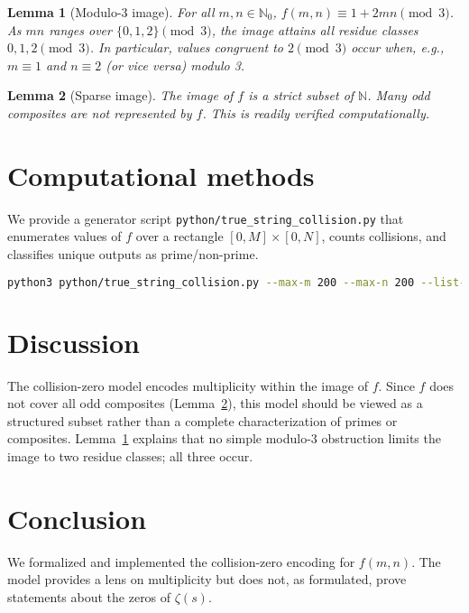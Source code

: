 \documentclass[12pt,a4paper]{article}
\newtheorem{lemma}{Lemma}[section]
\begin{document}
\begin{lemma}[Modulo-3 image]\label{lem:mod3}
For all \(m,n\in\mathbb{N}_0\), \(f(m,n) \equiv 1 + 2mn \pmod{3}\). As \(mn\) ranges over \(\{0,1,2\}\pmod{3}\), the image attains all residue classes \(0,1,2\pmod{3}\). In particular, values congruent to \(2\pmod{3}\) occur when, e.g., \(m\equiv 1\) and \(n\equiv 2\) (or vice versa) modulo 3.
\end{lemma}

\begin{lemma}[Sparse image]\label{lem:sparse}
The image of \(f\) is a strict subset of \(\mathbb{N}\). Many odd composites are not represented by \(f\). This is readily verified computationally.
\end{lemma}

\section{Computational methods}
We provide a generator script \texttt{python/true\_string\_collision.py} that enumerates values of \(f\) over a rectangle \([0,M]\times[0,N]\), counts collisions, and classifies unique outputs as prime/non-prime.

\begin{lstlisting}[language=bash,caption=Example usage]
python3 python/true_string_collision.py --max-m 200 --max-n 200 --list-first 20
\end{lstlisting}

\section{Discussion}
The collision-zero model encodes multiplicity within the image of \(f\). Since \(f\) does not cover all odd composites (Lemma~\ref{lem:sparse}), this model should be viewed as a structured subset rather than a complete characterization of primes or composites. Lemma~\ref{lem:mod3} explains that no simple modulo-3 obstruction limits the image to two residue classes; all three occur.

\section{Conclusion}
We formalized and implemented the collision-zero encoding for \(f(m,n)\). The model provides a lens on multiplicity but does not, as formulated, prove statements about the zeros of \(\zeta(s)\).
\end{document}
